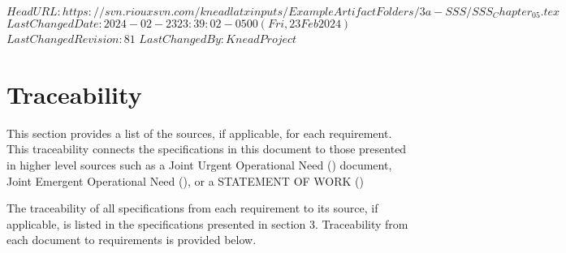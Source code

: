 \svnidlong
{$HeadURL: https://svn.riouxsvn.com/kneadlatxinputs/ExampleArtifactFolders/3a-SSS/SSS_Chapter_05.tex $}
{$LastChangedDate: 2024-02-23 23:39:02 -0500 (Fri, 23 Feb 2024) $}
{$LastChangedRevision: 81 $}
{$LastChangedBy: KneadProject $}

\chapter{Traceability}

This section provides a list of the sources, if applicable, for each requirement.
This traceability connects the specifications in this document to those presented in higher level sources such as a Joint Urgent Operational Need (\JUON) document, Joint Emergent Operational Need (\JEON), or a STATEMENT OF WORK (\SOW)

The traceability of all specifications from each requirement to its source, if applicable, is listed in the specifications presented in section 3. Traceability from each document to requirements is provided below.


\begingroup %
\newlength{\LeftColumnWidth}
\setlength{\LeftColumnWidth}{4.5in}%
	
